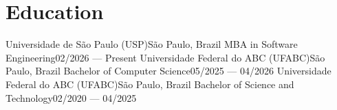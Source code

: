 \section{Education}
\resumeSubHeadingListStart
\resumeSubheading
{Universidade de São Paulo (USP)}{São Paulo, Brazil}
{MBA in Software Engineering}{02/2026 --- Present}
\resumeSubheading
{Universidade Federal do ABC (UFABC)}{São Paulo, Brazil}
{Bachelor of Computer Science}{05/2025 --- 04/2026}
\resumeSubheading
{Universidade Federal do ABC (UFABC)}{São Paulo, Brazil}
{Bachelor of Science and Technology}{02/2020 --- 04/2025}
\resumeSubHeadingListEnd

